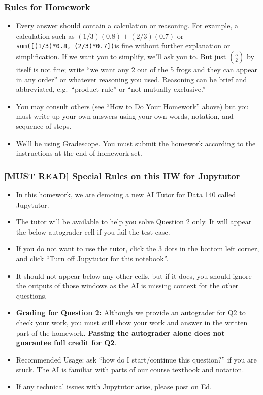 \documentclass[11pt]{article}
\providecommand{\tightlist}{%
      \setlength{\itemsep}{0pt}\setlength{\parskip}{0pt}}
\begin{document}
    \hypertarget{rules-for-homework}{%
\subsubsection{Rules for Homework}\label{rules-for-homework}}

\begin{itemize}
\tightlist
\item
  Every answer should contain a calculation or reasoning. For example, a
  calculation such as \((1/3)(0.8) + (2/3)(0.7)\) or
  \texttt{sum({[}(1/3)*0.8,\ (2/3)*0.7{]})}is fine without further
  explanation or simplification. If we want you to simplify, we'll ask
  you to. But just \({5 \choose 2}\) by itself is not fine; write ``we
  want any 2 out of the 5 frogs and they can appear in any order'' or
  whatever reasoning you used. Reasoning can be brief and abbreviated,
  e.g.~``product rule'' or ``not mutually exclusive.''
\item
  You may consult others (see ``How to Do Your Homework'' above) but you
  must write up your own answers using your own words, notation, and
  sequence of steps.
\item
  We'll be using Gradescope. You must submit the homework according to
  the instructions at the end of homework set.
\end{itemize}

\hypertarget{must-read-special-rules-on-this-hw-for-jupytutor}{%
\subsubsection{\texorpdfstring{\textbf{{[}MUST READ{]} Special Rules on
this HW for
Jupytutor}}{{[}MUST READ{]} Special Rules on this HW for Jupytutor}}\label{must-read-special-rules-on-this-hw-for-jupytutor}}

\begin{itemize}
\tightlist
\item
  In this homework, we are demoing a new AI Tutor for Data 140 called
  Jupytutor.
\item
  The tutor will be available to help you solve Question 2 only. It will
  appear the below autograder cell if you fail the test case.
\item
  If you do not want to use the tutor, click the 3 dots in the bottom
  left corner, and click ``Turn off Jupytutor for this notebook''.
\item
  It should not appear below any other cells, but if it does, you should
  ignore the outputs of those windows as the AI is missing context for
  the other questions.
\item
  \textbf{Grading for Question 2:} Although we provide an autograder for
  Q2 to check your work, you must still show your work and answer in the
  written part of the homework. \textbf{Passing the autograder alone
  does not guarantee full credit for Q2}.
\item
  Recommended Usage: ask ``how do I start/continue this question?'' if
  you are stuck. The AI is familiar with parts of our course textbook
  and notation.
\item
  If any technical issues with Jupytutor arise, please post on Ed.
\end{itemize}
\end{document}
